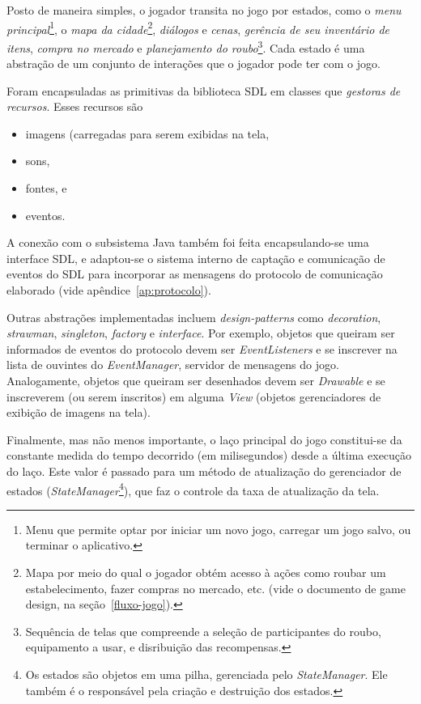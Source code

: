 Posto de maneira simples, o jogador transita no jogo por estados, como
o \emph{menu principal}\footnote{Menu que permite optar por iniciar um
  novo jogo, carregar um jogo salvo, ou terminar o aplicativo.}, o
\emph{mapa da cidade}\footnote{Mapa por meio do qual o jogador obtém
  acesso à ações como roubar um estabelecimento, fazer compras no
  mercado, etc. (vide o documento de game design, na
  seção~\ref{fluxo-jogo}).}, \emph{diálogos} e \emph{cenas}, 
\emph{gerência de seu inventário de itens}, \emph{compra no mercado} e
\emph{planejamento do roubo}\footnote{Sequência de telas que
  compreende a seleção de participantes do roubo, equipamento a usar,
  e disribuição das recompensas.}. Cada estado é uma abstração de um
conjunto de interações que o jogador pode ter com o jogo.

Foram encapsuladas as primitivas da biblioteca SDL em classes que
\emph{gestoras de recursos}. Esses recursos são
\begin{itemize}
\item imagens (carregadas para serem exibidas na tela,
\item sons,
\item fontes, e
\item eventos.
\end{itemize}

A conexão com o subsistema Java também foi feita encapsulando-se uma
interface SDL, e adaptou-se o sistema interno de captação e
comunicação de eventos do SDL para incorporar as mensagens do
protocolo de comunicação elaborado (vide apêndice~\ref{ap:protocolo}).

Outras abstrações implementadas incluem \emph{design-patterns} como
\emph{decoration}, \emph{strawman}, \emph{singleton}, \emph{factory} e
\emph{interface}. Por exemplo, objetos que queiram ser informados de
eventos do protocolo devem ser \emph{EventListeners} e se inscrever na
lista de ouvintes do \emph{EventManager}, servidor de mensagens do
jogo. Analogamente, objetos que queiram ser desenhados devem ser
\emph{Drawable} e se inscreverem (ou serem inscritos) em alguma
\emph{View} (objetos gerenciadores de exibição de imagens na
tela).

Finalmente, mas não menos importante, o laço principal do jogo
constitui-se da constante medida do tempo decorrido (em milisegundos)
desde a última execução do laço. Este valor é passado para um método
de atualização do gerenciador de estados
(\emph{StateManager}\footnote{Os estados são objetos em uma pilha,
  gerenciada pelo \emph{StateManager}. Ele também é o responsável pela
criação e destruição dos estados.}), que faz o controle da taxa
de atualização da tela.




